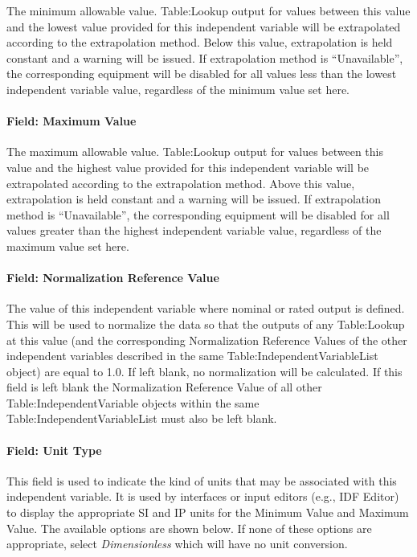 The minimum allowable value. Table:Lookup output for values between this
value and the lowest value provided for this independent variable will
be extrapolated according to the extrapolation method. Below this value,
extrapolation is held constant and a warning will be issued. If
extrapolation method is ``Unavailable'', the corresponding equipment
will be disabled for all values less than the lowest independent
variable value, regardless of the minimum value set here.

\paragraph{Field: Maximum Value}\label{field-maximum-value}

The maximum allowable value. Table:Lookup output for values between this
value and the highest value provided for this independent variable will
be extrapolated according to the extrapolation method. Above this value,
extrapolation is held constant and a warning will be issued. If
extrapolation method is ``Unavailable'', the corresponding equipment
will be disabled for all values greater than the highest independent
variable value, regardless of the maximum value set here.

\paragraph{Field: Normalization Reference Value}\label{field-normalization--reference-value}

The value of this independent variable where nominal or rated output is
defined. This will be used to normalize the data so that the outputs of
any Table:Lookup at this value (and the corresponding Normalization
Reference Values of the other independent variables described in the same
Table:IndependentVariableList object) are equal to 1.0. If left blank, no
normalization will be calculated. If this field is left blank the Normalization
Reference Value of all other Table:IndependentVariable objects within the same
Table:IndependentVariableList must also be left blank.

\paragraph{Field: Unit Type}

This field is used to indicate the kind of units that may be associated
with this independent variable. It is used by interfaces or input editors (e.g., IDF Editor) to display the
appropriate SI and IP units for the Minimum Value and Maximum Value. The
available options are shown below. If none of these options are
appropriate, select \emph{Dimensionless} which will have no unit
conversion.

